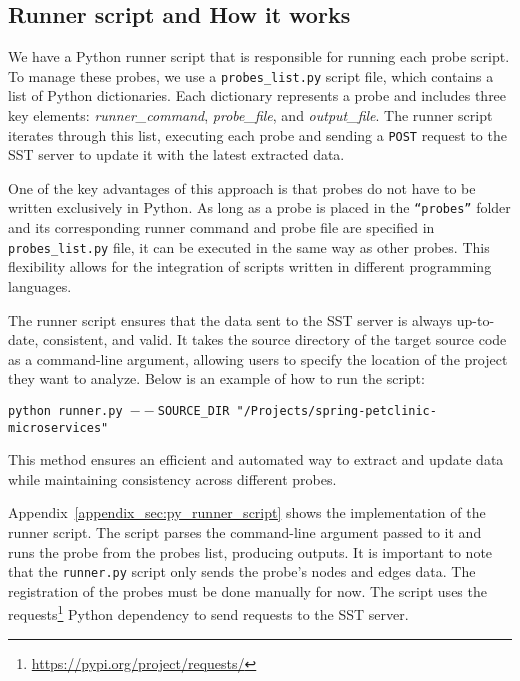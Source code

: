 \subsection{Runner script and How it works}

We have a Python runner script that is responsible for running each probe script. To manage these probes, we use a \texttt{probes\_list.py} script file, which contains a list of Python dictionaries. Each dictionary represents a probe and includes three key elements: \textit{runner\_command}, \textit{probe\_file}, and \textit{output\_file}. The runner script iterates through this list, executing each probe and sending a \texttt{POST} request to the SST server to update it with the latest extracted data.  

One of the key advantages of this approach is that probes do not have to be written exclusively in Python. As long as a probe is placed in the \texttt{``probes''} folder and its corresponding runner command and probe file are specified in \texttt{probes\_list.py} file, it can be executed in the same way as other probes. This flexibility allows for the integration of scripts written in different programming languages.  

The runner script ensures that the data sent to the SST server is always up-to-date, consistent, and valid. It takes the source directory of the target source code as a command-line argument, allowing users to specify the location of the project they want to analyze. Below is an example of how to run the script:

\begin{tcolorbox}[colback=gray!5, colframe=gray!20]
    \texttt{python runner.py \newline ${--}$SOURCE\_DIR "/Projects/spring-petclinic-microservices"}
\end{tcolorbox}

This method ensures an efficient and automated way to extract and update data while maintaining consistency across different probes.

Appendix~\ref{appendix_sec:py_runner_script} shows the implementation of the runner script. The script parses the command-line argument passed to it and runs the probe from the probes list, producing outputs. It is important to note that the \texttt{runner.py} script only sends the probe's nodes and edges data. The registration of the probes must be done manually for now. The script uses the requests\footnote{\url{https://pypi.org/project/requests/}} Python dependency to send requests to the SST server.